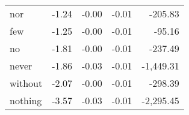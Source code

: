 \begin{table}[ht]
\begin{tabular}{lrrrr}
nor & {\cellcolor[HTML]{D5E7F1}} \color[HTML]{000000} -1.24 & {\cellcolor[HTML]{62A7CE}} \color[HTML]{F1F1F1} -0.00 & {\cellcolor[HTML]{124984}} \color[HTML]{F1F1F1} -0.01 & {\cellcolor[HTML]{9BC9E0}} \color[HTML]{000000} -205.83 \\
few & {\cellcolor[HTML]{D5E7F1}} \color[HTML]{000000} -1.25 & {\cellcolor[HTML]{75B2D4}} \color[HTML]{F1F1F1} -0.00 & {\cellcolor[HTML]{073467}} \color[HTML]{F1F1F1} -0.01 & {\cellcolor[HTML]{A7D0E4}} \color[HTML]{000000} -95.16 \\
no & {\cellcolor[HTML]{98C8E0}} \color[HTML]{000000} -1.81 & {\cellcolor[HTML]{65A9CF}} \color[HTML]{F1F1F1} -0.00 & {\cellcolor[HTML]{09386D}} \color[HTML]{F1F1F1} -0.01 & {\cellcolor[HTML]{98C8E0}} \color[HTML]{000000} -237.49 \\
never & {\cellcolor[HTML]{93C6DE}} \color[HTML]{000000} -1.86 & {\cellcolor[HTML]{0C3D73}} \color[HTML]{F1F1F1} -0.03 & {\cellcolor[HTML]{114781}} \color[HTML]{F1F1F1} -0.01 & {\cellcolor[HTML]{2A71B2}} \color[HTML]{F1F1F1} -1,449.31 \\
without & {\cellcolor[HTML]{75B2D4}} \color[HTML]{F1F1F1} -2.07 & {\cellcolor[HTML]{5FA5CD}} \color[HTML]{F1F1F1} -0.00 & {\cellcolor[HTML]{08366A}} \color[HTML]{F1F1F1} -0.01 & {\cellcolor[HTML]{93C6DE}} \color[HTML]{000000} -298.39 \\
nothing & {\cellcolor[HTML]{053061}} \color[HTML]{F1F1F1} -3.57 & {\cellcolor[HTML]{053061}} \color[HTML]{F1F1F1} -0.03 & {\cellcolor[HTML]{053061}} \color[HTML]{F1F1F1} -0.01 & {\cellcolor[HTML]{053061}} \color[HTML]{F1F1F1} -2,295.45 \\
\bottomrule
\end{tabular}
\end{table}
